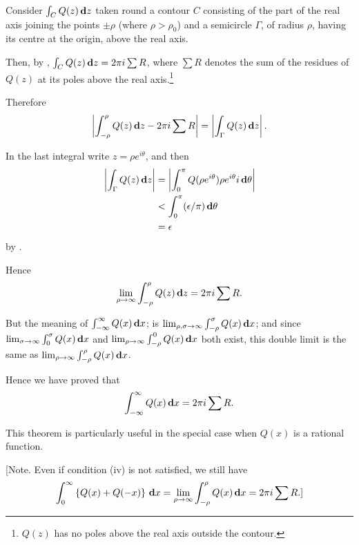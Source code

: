 Consider $\int_{C} Q(z) \, \mathbf{d} z$ taken round a contour $C$
consisting of the part of the real axis joining the points $\pm\rho$
(where $\rho > \rho_{0}$) and a semicircle $\Gamma$, of radius $\rho$,
having its centre at the origin, above the real axis.

Then, by , $\int_{C} Q(z) \, \mathbf{d} z = 2 \pi i
\sum R$, where $\sum R$ denotes the sum of the residues of $Q(z)$ at
its poles above the real axis.\footnote{$Q(z)$ has no poles above the
  real axis outside the contour.}

%
%
Therefore
$$
\left| 
  \int_{-\rho}^{\rho} Q(z) \, \mathbf{d} z
  -
  2 \pi i \sum R
 \right|
=
\left| 
  \int_{\Gamma} Q(z) \, \mathbf{d} z
 \right|.
$$

In the last integral write $z = \rho e^{i\theta}$, and then
\begin{align*}
  \left|  \int_{\Gamma} Q(z) \, \mathbf{d} z   \right|
  &=
  \left| 
    \int_{0}^{\pi} Q(\rho e^{i\theta}) \rho e^{i\theta} i
    \, \mathbf{d}\theta
   \right|
  \\
  &<
  \int_{0}^{\pi} (\epsilon / \pi) \, \mathbf{d} \theta
  \\
  &= \epsilon
\end{align*}
by .

Hence 
$$
\lim_{\rho\rightarrow\infty}
\int_{-\rho}^{\rho} Q(z) \, \mathbf{d} z
=
2\pi i \sum R.
$$

But the meaning of $\int_{-\infty}^{\infty} Q(x) \, \mathbf{d} x$;
is $\lim_{\rho,\sigma\rightarrow\infty}\int_{-\rho}^{\sigma} Q(x)
\, \mathbf{d} x$;
and since
$\lim_{\sigma\rightarrow\infty}\int_{0}^{\sigma} Q(x) \, \mathbf{d} x$
and
$\lim_{\rho\rightarrow\infty}\int_{-\rho}^{0} Q(x) \, \mathbf{d} x$
both exist, this double limit is the same as
$\lim_{\rho\rightarrow\infty}\int_{-\rho}^{\rho} Q(x) \, \mathbf{d} x$.

Hence we have proved that
$$
\int_{-\infty}^{\infty} Q(x) \, \mathbf{d} x = 2\pi i \sum R.
$$

This theorem is particularly useful in the special case when $Q(x)$ is a
rational function.

[Note. Even if condition (iv) is not satisfied, we still have
$$
\int_{0}^{\infty}
\left\{ 
  Q(x) + Q(-x)
 \right\} \, \mathbf{d} x
=
\lim_{\rho\rightarrow\infty} \int_{-\rho}^{\rho} Q(x) \, \mathbf{d} x
= 2 \pi i \sum R.]
$$

